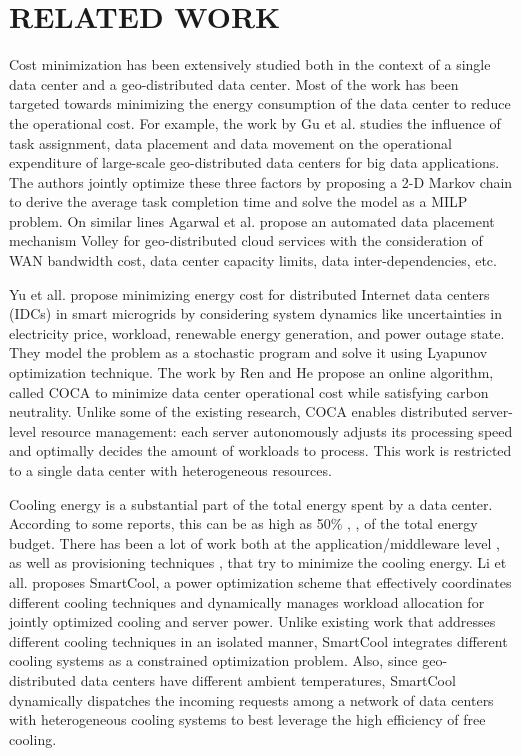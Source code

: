 \documentclass[letterpaper,twocolumn,10pt]{article}
\begin{document}
\section{RELATED WORK}
\label{sec:related} 
Cost minimization has been extensively studied both in the context of a single data center and a geo-distributed data center. Most of the work has been targeted towards minimizing the energy consumption of the data center to reduce the operational cost. For example, the work by Gu et al. \cite{gu2014cost} studies the influence of task assignment, data placement  and data movement on the operational expenditure of large-scale geo-distributed data centers for big data applications. The authors jointly optimize  these three factors by proposing a 2-D Markov chain to derive the average task completion time and solve the model as a MILP problem. On similar lines Agarwal et al. \cite{agarwal2010volley} propose an automated data placement mechanism Volley for geo-distributed cloud services with the consideration of WAN bandwidth cost, data center capacity limits, data inter-dependencies, etc. 

Yu et all.\cite{yu2015energy} propose minimizing energy cost for distributed Internet data centers (IDCs) in smart microgrids by considering system dynamics like uncertainties in electricity price, workload, renewable energy generation, and power outage state. They model the problem as a stochastic program and solve it using Lyapunov optimization technique. The work by Ren and He  \cite{ren2013coca} propose an online algorithm, called COCA to minimize data center operational cost while satisfying carbon neutrality. Unlike some of the existing research, COCA enables distributed server-level resource management: each server autonomously adjusts its processing speed and optimally decides the amount of workloads to process. This work is restricted to a single data center with heterogeneous resources. 

Cooling energy is a substantial part of the total energy spent by a data center. According to some reports, this can be as high as 50\% \cite{sullivan2002alternating}, \cite{patel2003smart},\cite{sawyer2004calculating} of the total energy budget. There has been a lot of work both at the application/middleware level \cite{TempLDBSC11}, \cite{leverich2010energy} as well as provisioning techniques  \cite{tang2007thermal}, \cite{chen2010integrated} that try to minimize the cooling energy. Li et all. \cite{li2014coordinating} proposes SmartCool, a power optimization scheme that effectively coordinates different cooling techniques and dynamically manages workload allocation for jointly optimized cooling and server power. Unlike existing work that addresses different cooling techniques in an isolated manner, SmartCool integrates different cooling systems as a constrained optimization problem. Also, since geo-distributed data centers have different ambient temperatures, SmartCool dynamically dispatches the incoming requests among a network of data centers with heterogeneous cooling systems to best leverage the high efficiency of free cooling.  
\end{document}
